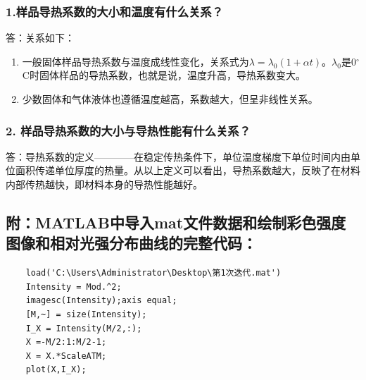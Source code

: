 \documentclass[12pt,a4paper,UTF8]{ctexart}
\begin{document}
	\subsubsection*{1.样品导热系数的大小和温度有什么关系？}
	答：关系如下：
	\begin{enumerate}[(1)]
			\item 一般固体样品导热系数与温度成线性变化，关系式为$\lambda=\lambda_0(1+\alpha t)$。$\lambda_0$是0$^{\circ}$C时固体样品的导热系数，也就是说，温度升高，导热系数变大。
			\item 少数固体和气体液体也遵循温度越高，系数越大，但呈非线性关系。
	\end{enumerate}

	\subsubsection*{2. 样品导热系数的大小与导热性能有什么关系？}
	答：导热系数的定义————在稳定传热条件下，单位温度梯度下单位时间内由单位面积传递单位厚度的热量。从以上定义可以看出，导热系数越大，反映了在材料内部传热越快，即材料本身的导热性能越好。


\newpage %
\subsection*{附：MATLAB中导入mat文件数据和绘制彩色强度图像和相对光强分布曲线的完整代码：}

	\begin{lstlisting}
	load('C:\Users\Administrator\Desktop\第1次迭代.mat')
	Intensity = Mod.^2;
	imagesc(Intensity);axis equal;
	[M,~] = size(Intensity);
	I_X = Intensity(M/2,:);
	X =-M/2:1:M/2-1;
	X = X.*ScaleATM;
	plot(X,I_X);
	\end{lstlisting}
\end{document}
